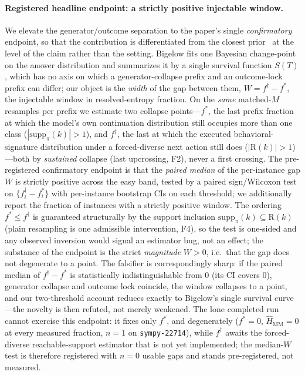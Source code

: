 \paragraph{Registered headline endpoint: a strictly positive injectable window.}
We elevate the generator/outcome separation to the paper's single
\emph{confirmatory} endpoint, so that the contribution is differentiated from the
closest prior~\citep{bigelow2024forking} at the level of the claim rather than the
setting. Bigelow fits one Bayesian change-point on the answer distribution and
summarizes it by a single survival function $S(T)$, which has no axis on which a
generator-collapse prefix and an outcome-lock prefix can differ; our object is the
\emph{width} of the gap between them, $W=f^\dagger-f^\ast$, the injectable window in
resolved-entropy fraction. On the \emph{same} matched-$M$ resamples per prefix we
estimate two collapse points---$f^\ast$, the last prefix fraction at which the
model's own continuation distribution still occupies more than one class
($|\mathrm{supp}_\pi(k)|>1$), and $f^\dagger$, the last at which the executed
behavioral-signature distribution under a forced-diverse next action still does
($|\mathrm{R}(k)|>1$)---both by \emph{sustained} collapse (last upcrossing, F2),
never a first crossing. The pre-registered confirmatory endpoint is that the
\emph{paired median} of the per-instance gap $W$ is strictly positive across the
easy band, tested by a paired sign/Wilcoxon test on $\{f^\dagger_i-f^\ast_i\}$ with
per-instance bootstrap CIs on each threshold; we additionally report the fraction of
instances with a strictly positive window. The ordering $f^\ast\le f^\dagger$ is
guaranteed structurally by the support inclusion
$\mathrm{supp}_\pi(k)\subseteq\mathrm{R}(k)$ (plain resampling is one admissible
intervention, F4), so the test is one-sided and any observed inversion would signal
an estimator bug, not an effect; the substance of the endpoint is the strict
\emph{magnitude} $W>0$, i.e.\ that the gap does not degenerate to a point. The
falsifier is correspondingly sharp: if the paired median of $f^\dagger-f^\ast$ is
statistically indistinguishable from $0$ (its CI covers $0$), generator collapse and
outcome lock coincide, the window collapses to a point, and our two-threshold account
reduces exactly to Bigelow's single survival curve---the novelty is then refuted, not
merely weakened. The lone completed run cannot exercise this endpoint: it fixes only
$f^\ast$, and degenerately ($f^\ast=0$, $\widehat{H}_{\mathrm{MM}}=0$ at every measured
fraction, $n\!=\!1$ on \texttt{sympy-22714}), while $f^\dagger$ awaits the
forced-diverse reachable-support estimator that is not yet implemented; the median-$W$
test is therefore registered with $n=0$ usable gaps and stands pre-registered, not
measured.

